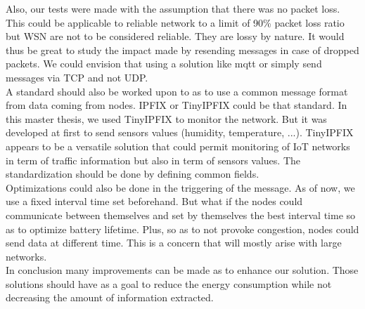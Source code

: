 Also, our tests were made with the assumption that there was no packet loss. This could be applicable to reliable network to a limit of 90\% packet loss ratio but WSN are not to be considered reliable. They are lossy by nature. It would thus be great to study the impact made by resending messages in case of dropped packets. We could envision that using a solution like \acrshort{mqtt} \cite{website:mqtt} or simply send messages via TCP and not UDP.\\

A standard should also be worked upon to as to use a common message format from data coming from nodes. IPFIX or TinyIPFIX could be that standard. In this master thesis, we used TinyIPFIX to monitor the network. But it was developed at first to send sensors values (humidity, temperature, ...). TinyIPFIX appears to be a versatile solution that could permit monitoring of IoT networks in term of traffic information but also in term of sensors values. The standardization should be done by defining common fields.\\

Optimizations could also be done in the triggering of the message. As of now, we use a fixed interval time set beforehand. But what if the nodes could communicate between themselves and set by themselves the best interval time so as to optimize battery lifetime. Plus, so as to not provoke congestion, nodes could send data at different time. This is a concern that will mostly arise with large networks.\\

In conclusion many improvements can be made as to enhance our solution. Those solutions should have as a goal to reduce the energy consumption while not decreasing the amount of information extracted.
